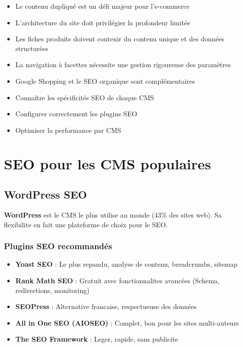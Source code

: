 \documentclass[12pt,a4paper,twoside]{report}
\newcommand{\keyword}[1]{\textbf{\textcolor{googleblue}{#1}}}
\newcommand{\level}[1]{\medskip\bigskip}
\begin{document}
\begin{takeaways}
\begin{itemize}
    \item Le contenu dupliqué est un défi majeur pour l'e-commerce
    \item L'architecture du site doit privilégier la profondeur limitée
    \item Les fiches produits doivent contenir du contenu unique et des données structurées
    \item La navigation à facettes nécessite une gestion rigoureuse des paramètres
    \item Google Shopping et le SEO organique sont complémentaires
\end{itemize}
\end{takeaways}

\level{2}
\begin{objectives}
\begin{itemize}
    \item Connaître les spécificités SEO de chaque CMS
    \item Configurer correctement les plugins SEO
    \item Optimiser la performance par CMS
\end{itemize}
\end{objectives}

\chapter{SEO pour les CMS populaires}
\label{ch:cmsseo}

\section{WordPress SEO}

\keyword{WordPress} est le CMS le plus utilise au monde (43\% des sites web). Sa flexibilite en fait une plateforme de choix pour le SEO.

\subsection{Plugins SEO recommandés}

\begin{itemize}
    \item \textbf{Yoast SEO} : Le plus repandu, analyse de contenu, breadcrumbs, sitemap
    \item \textbf{Rank Math SEO} : Gratuit avec fonctionnalites avancées (Schema, redirections, monitoring)
    \item \textbf{SEOPress} : Alternative francaise, respectueuse des données
    \item \textbf{All in One SEO (AIOSEO)} : Complet, bon pour les sites multi-auteurs
    \item \textbf{The SEO Framework} : Leger, rapide, sans publicite
\end{itemize}
\end{document}
